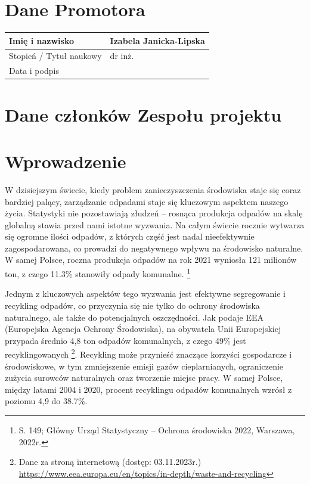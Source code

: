 \documentclass[12pt, a4paper, twoside, openany]{book}
\newcommand{\forceindent}{\leavevmode{\parindent=1.3em\indent}}
\begin{document}
\section{Dane Promotora}

\noindent
\begin{tabular}{ |p{5cm}|p{7cm}|}
    \hline
    Imię i nazwisko         & Izabela Janicka-Lipska \\
    \hline
    Stopień / Tytuł naukowy & dr inż.                \\
    \hline
    Data i podpis           &                        \\ \hline
\end{tabular}

\section{Dane członków Zespołu projektu}

\membersTable

\section{Wprowadzenie}
\forceindent W dzisiejszym świecie, kiedy problem zanieczyszczenia środowiska staje się coraz bardziej palący, zarządzanie odpadami staje się kluczowym aspektem naszego życia. Statystyki nie pozostawiają złudzeń -- rosnąca produkcja odpadów na skalę globalną stawia przed nami istotne wyzwania. Na całym świecie rocznie wytwarza się ogromne ilości odpadów, z których część jest nadal nieefektywnie zagospodarowana, co prowadzi do negatywnego wpływu na środowisko naturalne. W samej Polsce, roczna produkcja odpadów na rok 2021 wyniosła 121 milionów ton, z czego 11.3\% stanowiły odpady komunalne. \footnote{S. 149; Główny Urząd Statystyczny -- Ochrona środowiska 2022, Warszawa, 2022r.}

Jednym z kluczowych aspektów tego wyzwania jest efektywne segregowanie i recykling odpadów, co przyczynia się nie tylko do ochrony środowiska naturalnego, ale także do potencjalnych oszczędności. Jak podaje EEA (Europejska Agencja Ochrony Środowiska), na obywatela Unii Europejskiej przypada średnio 4,8 ton odpadów komunalnych, z czego 49\% jest recyklingowanych \footnote{Dane za stroną internetową (dostęp: 03.11.2023r.) \url{https://www.eea.europa.eu/en/topics/in-depth/waste-and-recycling}}. Recykling może przynieść znaczące korzyści gospodarcze i środowiskowe, w tym zmniejszenie emisji gazów cieplarnianych, ograniczenie zużycia surowców naturalnych oraz tworzenie miejsc pracy. W samej Polsce, między latami 2004 i 2020, procent recyklingu odpadów komunalnych wzrósł z poziomu 4,9 do 38.7\%.
\end{document}
